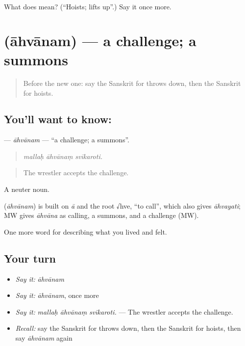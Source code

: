 \begin{tcolorbox}[breakable,colback=teal!4,colframe=teal!35!black,title={Before you move on}]
What does  mean? (\textquotedblleft{}Hoists; lifts up\textquotedblright{}.) Say it once more.
\end{tcolorbox}
\section[\texorpdfstring{\sk{आह्वानम्} (āhvānam)}{आह्वानम् (āhvānam)}]{ (āhvānam) — a challenge; a summons}

\label{lesson:SA-C525-ahvanam}



\begin{quote}
Before the new one: say the Sanskrit for throws down, then the Sanskrit for hoists.
\end{quote}

\subsection*{You'll want to know: }
\textbf{} — \emph{āhvānam} — \textquotedblleft{}a challenge; a summons\textquotedblright{}.

\begin{quote}
  
\end{quote}

\begin{quote}
\emph{mallaḥ āhvānaṃ svīkaroti.}
\end{quote}

\begin{quote}
The wrestler accepts the challenge.
\end{quote}

A neuter noun.

\begin{cousinweb}
\textbf{} (\emph{āhvānam}) is built on \emph{ā} and the root √hve, \textquotedblleft{}to call\textquotedblright{}, which also gives \emph{āhvayati}; MW gives \emph{āhvāna} as calling, a summons, and a challenge (MW).
\end{cousinweb}

\begin{grammarlens}[title={What you've built}]
One more word for describing what you lived and felt.
\end{grammarlens}

\subsection*{Your turn}
\begin{itemize}
\raggedright
  \item \emph{Say it:} \emph{āhvānam}
  \item \emph{Say it:} \emph{āhvānam}, once more
  \item \emph{Say it:} \emph{mallaḥ āhvānaṃ svīkaroti.} — The wrestler accepts the challenge.
  \item \emph{Recall:} say the Sanskrit for throws down, then the Sanskrit for hoists, then say \emph{āhvānam} again
\end{itemize}

